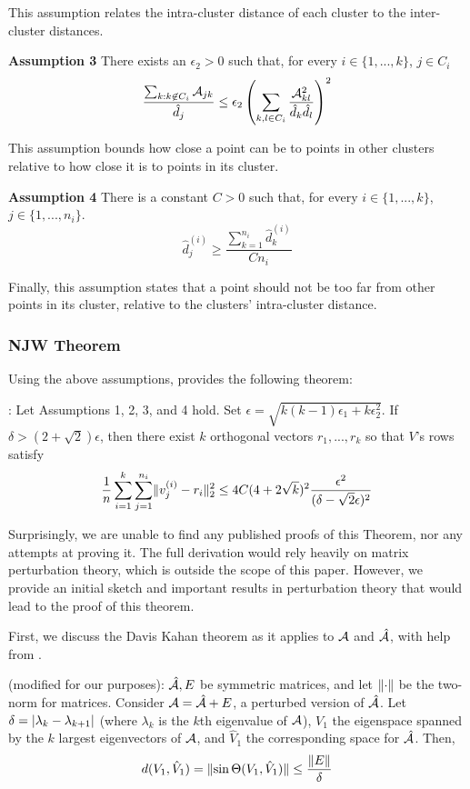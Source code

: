     This assumption relates the intra-cluster distance of each cluster to the
    inter-cluster distances.

\textbf{Assumption 3}
    There exists an $\epsilon_2 > 0$ such that, for every $i \in \{1,...,k\}$,
    $j \in C_i$
    \[ \frac{\sum_{k : k \not\in C_i} \mathcal{A}_{jk}}{\hat{d}_j} \leq
            \epsilon_2 \left(\sum_{k, l \in C_i} \frac{\mathcal{A}_{kl}^2}{\hat{d}_k\hat{d}_l}\right)^2 \]

    This assumption bounds how close a point can be to points in other clusters
    relative to how close it is to points in its cluster.

\textbf{Assumption 4}
    There is a constant $C > 0$ such that, for every $i \in \{1,...,k\}$,
    $j \in \{1,...,n_i\}$.
    \[ \hat{d}_j^{(i)} \geq \frac{\sum_{k=1}^{n_i} \hat{d}_k^{(i)}}{Cn_i} \]

    Finally, this assumption states that a point should not be too far from
    other points in its cluster, relative to the clusters' intra-cluster
    distance.

\subsubsection{NJW Theorem}
Using the above assumptions, \cite{ng2002spectral} provides the following
theorem:

: Let Assumptions 1, 2, 3, and 4 hold. Set
$\epsilon = \sqrt{k(k-1)\epsilon_1 + k \epsilon_2^2}$. If
$\delta > (2 + \sqrt{2}) \epsilon$, then there exist $k$ orthogonal vectors
$r_1, ..., r_k$ so that $V$'s rows satisfy
\[ \frac{1}{n} \sum_{i=1}^k \sum_{j=1}^{n_i} \lVert v_j^{(i)} - r_i\rVert_2^2 \leq
    4C (4 + 2 \sqrt{k})^2 \frac{\epsilon^2}{(\delta - \sqrt{2}\epsilon)^2} \]

Surprisingly, we are unable to find any published proofs of this Theorem, nor
any attempts at proving it. The full derivation would rely heavily on matrix
perturbation theory, which is outside the scope of this paper. However, we
provide an initial sketch and important results in perturbation theory that
would lead to the proof of this theorem.

First, we discuss the Davis Kahan theorem as it applies to $\mathcal{A}$ and $\hat{\mathcal{A}}$,
with help from \cite{von2007tutorial}.

 (modified for our purposes):
$\hat{\mathcal{A}}, E$ be symmetric matrices, and let $\lVert\cdot\rVert$ be the two-norm for
matrices. Consider $\mathcal{A} = \hat{\mathcal{A}} + E$, a perturbed version of $\hat{\mathcal{A}}$. Let
$\delta = \lvert\lambda_k - \lambda_{k+1}\rvert$ (where $\lambda_k$ is the $k$th
eigenvalue of $\mathcal{A}$), $V_1$ the eigenspace spanned by the $k$ largest eigenvectors
of $\mathcal{A}$, and $\hat{V}_1$ the corresponding space for $\hat{\mathcal{A}}$. Then,
\[ d(V_1, \hat{V}_1) = \lVert\sin \Theta(V_1, \hat{V}_1)\rVert \leq \frac{\lVert E\rVert}{\delta} \]

